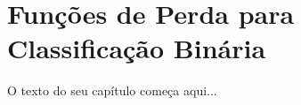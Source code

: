 
\chapter{Funções de Perda para Classificação Binária}
\label{cap:perda-binaria}

O texto do seu capítulo começa aqui...